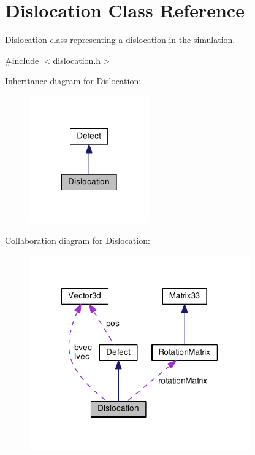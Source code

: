 \hypertarget{classDislocation}{\section{Dislocation Class Reference}
\label{d3/dc6/classDislocation}
}


\hyperlink{classDislocation}{Dislocation} class representing a dislocation in the simulation.  




{\ttfamily \#include $<$dislocation.\-h$>$}



Inheritance diagram for Dislocation\-:\nopagebreak
\begin{figure}[H]
\begin{center}
\leavevmode
\includegraphics[width=146pt]{df/dfa/classDislocation__inherit__graph}
\end{center}
\end{figure}


Collaboration diagram for Dislocation\-:\nopagebreak
\begin{figure}[H]
\begin{center}
\leavevmode
\includegraphics[width=270pt]{d7/d80/classDislocation__coll__graph}
\end{center}
\end{figure}
